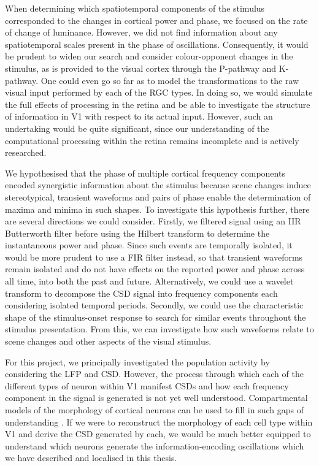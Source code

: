 When determining which spatiotemporal components of the stimulus corresponded to the changes in cortical power and phase, we focused on the rate of change of luminance.
However, we did not find information about any spatiotemporal scales present in the phase of oscillations.
Consequently, it would be prudent to widen our search and consider colour-opponent changes in the stimulus, as is provided to the visual cortex through the P-pathway and K-pathway.
One could even go so far as to model the transformations to the raw visual input performed by each of the \ac{RGC} types.
In doing so, we would simulate the full effects of processing in the retina and be able to investigate the structure of information in \ac{V1} with respect to its actual input.
However, such an undertaking would be quite significant, since our understanding of the computational processing within the retina remains incomplete and is actively researched.

We hypothesised that the phase of multiple cortical frequency components encoded synergistic information about the stimulus because scene changes induce stereotypical, transient waveforms and pairs of phase enable the determination of maxima and minima in such shapes.
To investigate this hypothesis further, there are several directions we could consider.
Firstly, we filtered signal using an \ac{IIR} Butterworth filter before using the Hilbert transform to determine the instantaneous power and phase.
Since such events are temporally isolated, it would be more prudent to use a \ac{FIR} filter instead, so that transient waveforms remain isolated and do not have effects on the reported power and phase across all time, into both the past and future.
Alternatively, we could use a wavelet transform to decompose the \ac{CSD} signal into frequency components each considering isolated temporal periods.
Secondly, we could use the characteristic shape of the stimulus-onset response to search for similar events throughout the stimulus presentation.
From this, we can investigate how such waveforms relate to scene changes and other aspects of the visual stimulus.


For this project, we principally investigated the population activity by considering the \ac{LFP} and \ac{CSD}.
However, the process through which each of the different types of neuron within \ac{V1} manifest \acp{CSD} and how each frequency component in the signal is generated is not yet well understood.
Compartmental models of the morphology of cortical neurons can be used to fill in such gaps of understanding \citep{Leski2013}.
If we were to reconstruct the morphology of each cell type within \ac{V1} and derive the \ac{CSD} generated by each, we would be much better equipped to understand which neurons generate the information-encoding oscillations which we have described and localised in this thesis.
